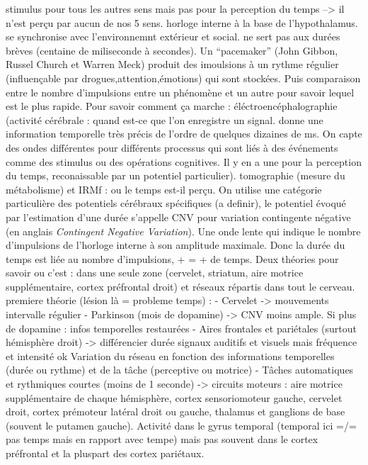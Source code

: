 \documentclass[12pt,fleqn,oneside,openany]{book} %
\begin{document}
	stimulus pour tous les autres sens mais pas pour la perception du temps --> il n'est perçu par aucun de nos 5 sens.
	horloge interne à la base de l'hypothalamus. se synchronise avec l'environnemnt extérieur et social. ne sert pas aux durées brèves (centaine de miliseconde à secondes).
	Un ``pacemaker'' (John Gibbon, Russel Church et Warren Meck) produit des imoulsions à un rythme régulier (influençable par drogues,attention,émotions) qui sont stockées. Puis comparaison entre le nombre d'impulsions entre un phénomène et un autre pour savoir lequel est le plus rapide.
	Pour savoir comment ça marche : éléctroencéphalographie (activité cérébrale : quand est-ce que l'on enregistre un signal. donne une information temporelle très précis de l'ordre de quelques dizaines de ms. On capte des ondes différentes pour différents processus qui sont liés à des événements comme des stimulus ou des opérations cognitives. Il y en a une pour la perception du temps, reconaissable par un potentiel particulier). tomographie (mesure du métabolisme) et IRMf : ou le temps est-il perçu.
	On utilise une catégorie particulière des potentiels cérébraux spécifiques (a definir), le potentiel évoqué par l'estimation d'une durée s'appelle CNV pour variation contingente négative (en anglais \emph{Contingent Negative Variation}). Une onde lente qui indique le nombre d'impulsions de l'horloge interne à son amplitude maximale. Donc la durée du temps est liée au nombre d'impulsions, + = + de temps.
	Deux théories pour savoir ou c'est : dans une seule zone (cervelet, striatum, aire motrice supplémentaire, cortex préfrontal droit) et réseaux répartis dans tout le cerveau.
	premiere théorie (lésion là = probleme temps) : 
		- Cervelet -> mouvements intervalle régulier
		- Parkinson (mois de dopamine) -> CNV moins ample. Si plus de dopamine : infos temporelles restaurées
		- Aires frontales et pariétales (surtout hémisphère droit) -> différencier durée signaux auditifs et visuels mais fréquence et intensité ok
	Variation du réseau en fonction des informations temporelles (durée ou rythme) et de la tâche (perceptive ou motrice)
		- Tâches automatiques et rythmiques courtes (moins de 1 seconde) -> circuits moteurs : aire motrice supplémentaire de chaque hémisphère, cortex sensoriomoteur gauche, cervelet droit, cortex prémoteur latéral droit ou gauche, thalamus et ganglions de base (souvent le putamen gauche). Activité dans le gyrus temporal (temporal ici =/= pas temps mais en rapport avec tempe) mais pas souvent dans le cortex préfrontal et la pluspart des cortex pariétaux.
\end{document}
